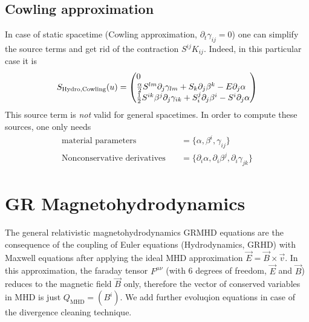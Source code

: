 \documentclass[a4paper]{article}
\newcommand{\desc}[1]{\text{#1}\quad}
\newcommand{\hydro}{\text{Hydro}}
\newcommand{\mhd}{\text{MHD}}
\newenvironment{pvector}{\begin{pmatrix*}[l]}{\end{pmatrix*}}
\begin{document}
\subsection{Cowling approximation}
In case of static spacetime (Cowling approximation,
$\partial_t \gamma_{ij} = 0$) one can simplify the source terms and
get rid of the contraction $S^{ij}K_{ij}$. Indeed, in this particular
case it is
\begin{equation}
S_{\hydro\text{,Cowling}}(u) =
\begin{pvector}
0
\\
\frac \alpha2 S^{lm} \partial_j \gamma_{lm} + S_k \partial_j \beta^k - E \partial_j \alpha
\\
\frac 12 S^{ik} \beta^j \partial_j \gamma_{ik} + S^j_i \partial_j \beta^i - S^i \partial_j \alpha
\end{pvector}
\end{equation}
This source term is \emph{not} valid for general spacetimes. In order to
compute these sources, one only needs
\begin{align}
\desc{material parameters}  &= \{ \alpha, \beta^i, \gamma_{ij} \}
\\
\desc{Nonconservative derivatives} &= \{ \partial_i \alpha,
\partial_i \beta^j, \partial_i \gamma_{jk} \}
\end{align}

\section{GR Magnetohydrodynamics}

The general relativistic magnetohydrodynamics GRMHD equations are
the consequence of the coupling of Euler equations 
(Hydrodynamics, GRHD) with Maxwell equations after applying the ideal MHD
approximation $\vec E = \vec B \times \vec v$. In this approximation,
the faraday tensor $F^{\mu\nu}$ (with 6 degrees of freedom, $\vec E$ 
and $\vec B$) reduces to the magnetic field $\vec B$ only, therefore the
vector of conserved variables in MHD is just $Q_\mhd = (B^i)$. We add
further evoluqion equations in case of the divergence cleaning technique.
\end{document}
